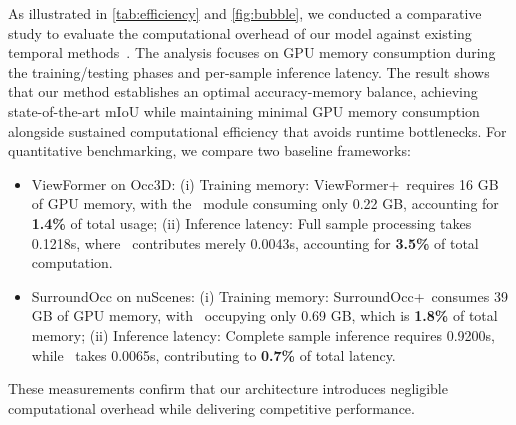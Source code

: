 As illustrated in \cref{tab:efficiency} and \cref{fig:bubble}, we conducted a comparative study to evaluate the computational overhead of our model against existing temporal methods~\cite{bevdet4d,opus,fb_occ}. The analysis focuses on GPU memory consumption during the training/testing phases and per-sample inference latency. The result shows that our method establishes an optimal accuracy-memory balance, achieving state-of-the-art mIoU while maintaining minimal GPU memory consumption alongside sustained computational efficiency that avoids runtime bottlenecks. For quantitative benchmarking, we compare two baseline frameworks:
\begin{itemize}
    \item ViewFormer on Occ3D: (i) Training memory: ViewFormer+\ours\ requires 16 GB of GPU memory, with the \ours\ module consuming only 0.22 GB, accounting for \textbf{1.4\%} of total usage; (ii) Inference latency: Full sample processing takes 0.1218s, where \ours\ contributes merely 0.0043s, accounting for \textbf{3.5\%} of total computation.
    \item SurroundOcc on nuScenes: (i) Training memory: SurroundOcc+\ours\ consumes 39 GB of GPU memory, with \ours\ occupying only 0.69 GB, which is \textbf{1.8\%} of total memory; (ii) Inference latency: Complete sample inference requires 0.9200s, while \ours\ takes 0.0065s, contributing to \textbf{0.7\%} of total latency.
\end{itemize}

These measurements confirm that our architecture introduces negligible computational overhead while delivering competitive performance.